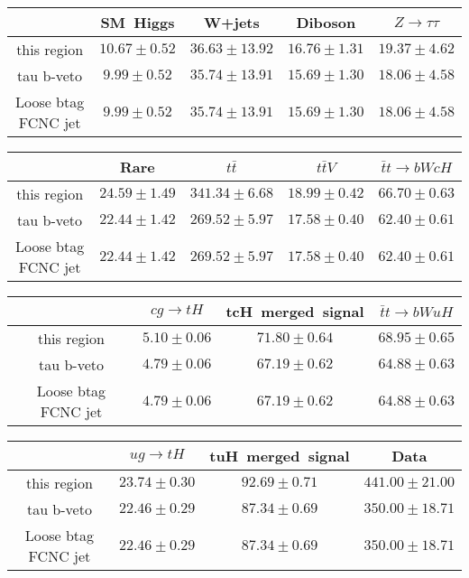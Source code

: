 \centering
\begin{tabular}{|c|c|c|c|c|} \hline
 & SM~Higgs & W+jets & Diboson & $Z\to \tau\tau$\\\hline
this region & $10.67\pm0.52$ & $36.63\pm13.92$ & $16.76\pm1.31$ & $19.37\pm4.62$\\\hline
tau b-veto & $9.99\pm0.52$ & $35.74\pm13.91$ & $15.69\pm1.30$ & $18.06\pm4.58$\\\hline
Loose btag FCNC jet & $9.99\pm0.52$ & $35.74\pm13.91$ & $15.69\pm1.30$ & $18.06\pm4.58$\\\hline
\end{tabular}
\begin{tabular}{|c|c|c|c|c|} \hline
 & Rare & $t\bar{t}$ & $t\bar{t}V$ & $\bar{t}t\to bWcH$\\\hline
this region & $24.59\pm1.49$ & $341.34\pm6.68$ & $18.99\pm0.42$ & $66.70\pm0.63$\\\hline
tau b-veto & $22.44\pm1.42$ & $269.52\pm5.97$ & $17.58\pm0.40$ & $62.40\pm0.61$\\\hline
Loose btag FCNC jet & $22.44\pm1.42$ & $269.52\pm5.97$ & $17.58\pm0.40$ & $62.40\pm0.61$\\\hline
\end{tabular}
\begin{tabular}{|c|c|c|c|} \hline
 & $cg\to tH$ & tcH~merged~signal & $\bar{t}t\to bWuH$\\\hline
this region & $5.10\pm0.06$ & $71.80\pm0.64$ & $68.95\pm0.65$\\\hline
tau b-veto & $4.79\pm0.06$ & $67.19\pm0.62$ & $64.88\pm0.63$\\\hline
Loose btag FCNC jet & $4.79\pm0.06$ & $67.19\pm0.62$ & $64.88\pm0.63$\\\hline
\end{tabular}
\begin{tabular}{|c|c|c|c|} \hline
 & $ug\to tH$ & tuH~merged~signal & Data\\\hline
this region & $23.74\pm0.30$ & $92.69\pm0.71$ & $441.00\pm21.00$\\\hline
tau b-veto & $22.46\pm0.29$ & $87.34\pm0.69$ & $350.00\pm18.71$\\\hline
Loose btag FCNC jet & $22.46\pm0.29$ & $87.34\pm0.69$ & $350.00\pm18.71$\\\hline
\end{tabular}
